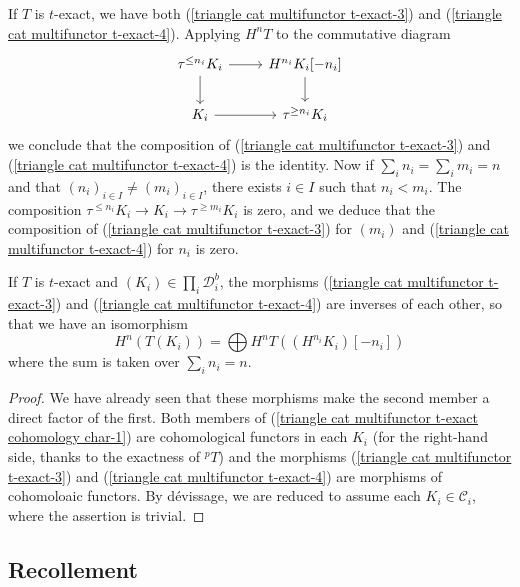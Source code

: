 If $T$ is $t$-exact, we have both (\ref{triangle cat multifunctor t-exact-3}) and (\ref{triangle cat multifunctor t-exact-4}). Applying $H^nT$ to the commutative diagram
\[\begin{tikzcd}
\tau^{\leq n_i}K_i\ar[d]\ar[r]&H^{n_i}K_i[-n_i]\ar[d]\\
K_i\ar[r]&\tau^{\geq n_i}K_i
\end{tikzcd}\]
we conclude that the composition of (\ref{triangle cat multifunctor t-exact-3}) and (\ref{triangle cat multifunctor t-exact-4}) is the identity. Now if $\sum_in_i=\sum_im_i=n$ and that $(n_i)_{i\in I}\neq (m_i)_{i\in I}$, there exists $i\in I$ such that $n_i<m_i$. The composition $\tau^{\leq n_i}K_i\to K_i\to\tau^{\geq m_i}K_i$ is zero, and we deduce that the composition of (\ref{triangle cat multifunctor t-exact-3}) for $(m_i)$ and (\ref{triangle cat multifunctor t-exact-4}) for $n_i$ is zero.

\begin{proposition}\label{triangle cat multifunctor t-exact cohomology char}
If $T$ is $t$-exact and $(K_i)\in\prod_i\mathcal{D}_i^b$, the morphisms (\ref{triangle cat multifunctor t-exact-3}) and (\ref{triangle cat multifunctor t-exact-4}) are inverses of each other, so that we have an isomorphism
\begin{equation}\label{triangle cat multifunctor t-exact cohomology char-1}
H^n(T(K_i))=\bigoplus H^nT((H^{n_i}K_i)[-n_i])
\end{equation}
where the sum is taken over $\sum_in_i=n$.
\end{proposition}
\begin{proof}
We have already seen that these morphisms make the second member a direct factor of the first. Both members of (\ref{triangle cat multifunctor t-exact cohomology char-1}) are cohomological functors in each $K_i$ (for the right-hand side, thanks to the exactness of ${^pT}$) and the morphisms (\ref{triangle cat multifunctor t-exact-3}) and (\ref{triangle cat multifunctor t-exact-4}) are morphisms of cohomoloaic functors. By d\'evissage, we are reduced to assume each $K_i\in\mathcal{C}_i$, where the assertion is trivial.
\end{proof}

\subsection{Recollement}
